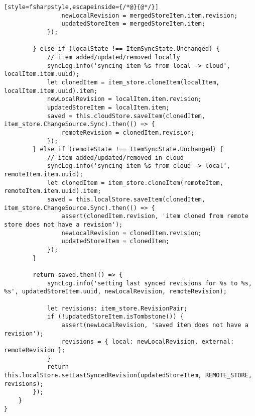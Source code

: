 \begin{lstlisting}[style=fsharpstyle,escapeinside={/*@}{@*/}]
				newLocalRevision = mergedStoreItem.item.revision;
				updatedStoreItem = mergedStoreItem.item;
			});

		} else if (localState !== ItemSyncState.Unchanged) {
			// item added/updated/removed locally
			syncLog.info('syncing item %s from local -> cloud', localItem.item.uuid);
			let clonedItem = item_store.cloneItem(localItem, localItem.item.uuid).item;
			newLocalRevision = localItem.item.revision;
			updatedStoreItem = localItem.item;
			saved = this.cloudStore.saveItem(clonedItem, item_store.ChangeSource.Sync).then(() => {
				remoteRevision = clonedItem.revision;
			});
		} else if (remoteState !== ItemSyncState.Unchanged) {
			// item added/updated/removed in cloud
			syncLog.info('syncing item %s from cloud -> local', remoteItem.item.uuid);
			let clonedItem = item_store.cloneItem(remoteItem, remoteItem.item.uuid).item;
			saved = this.localStore.saveItem(clonedItem, item_store.ChangeSource.Sync).then(() => {
				assert(clonedItem.revision, 'item cloned from remote store does not have a revision');
				newLocalRevision = clonedItem.revision;
				updatedStoreItem = clonedItem;
			});
		}

		return saved.then(() => {
			syncLog.info('setting last synced revisions for %s to %s, %s', updatedStoreItem.uuid, newLocalRevision, remoteRevision);

			let revisions: item_store.RevisionPair;
			if (!updatedStoreItem.isTombstone()) {
				assert(newLocalRevision, 'saved item does not have a revision');
				revisions = { local: newLocalRevision, external: remoteRevision };
			}
			return this.localStore.setLastSyncedRevision(updatedStoreItem, REMOTE_STORE, revisions);
		});
	}
}
\end{lstlisting}